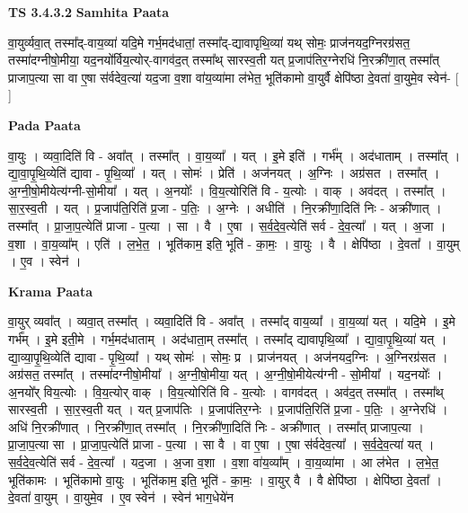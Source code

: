 \documentclass[17pt]{extarticle}
\begin{document}
\textbf{TS 3.4.3.2 } \newline
\textbf{Samhita Paata} \newline

वा॒युर्व्यवा॒त् तस्मा᳚द्-वाय॒व्या॑ यदि॒मे गर्भ॒मद॑धातां॒ तस्मा᳚द्-द्यावापृथि॒व्या॑ यथ् सोमः॒ प्राज॑नयद॒ग्निरग्र॑सत॒ तस्मा॑दग्नीषो॒मीया॒ यद॒नयो᳚र्विय॒त्योर्-वागव॑द॒त् तस्मा᳚थ् सारस्व॒ती यत् प्र॒जाप॑तिर॒ग्नेरधि॑ नि॒रक्री॑णा॒त् तस्मा᳚त् प्राजाप॒त्या सा वा ए॒षा स॑र्वदेव॒त्या॑ यद॒जा व॒शा वा॑य॒व्या॑मा ल॑भेत॒ भूति॑कामो वा॒युर्वै क्षेपि॑ष्ठा दे॒वता॑ वा॒युमे॒व स्वेन॑- [  ] \newline

\textbf{Pada Paata} \newline

वा॒युः । व्यवा॒दिति॑ वि - अवा᳚त् । तस्मा᳚त् । वा॒य॒व्या᳚ । यत् । इ॒मे इति॑ । गर्भ᳚म् । अद॑धाताम् । तस्मा᳚त् । द्या॒वा॒पृ॒थि॒व्येति॑ द्यावा - पृ॒थि॒व्या᳚ । यत् । सोमः॑ । प्रेति॑ । अज॑नयत् । अ॒ग्निः । अग्र॑सत । तस्मा᳚त् । अ॒ग्नी॒षो॒मीयेत्य॑ग्नी-सो॒मीया᳚ । यत् । अ॒नयोः᳚ । वि॒य॒त्योरिति॑ वि - य॒त्योः । वाक् । अव॑दत् । तस्मा᳚त् । सा॒र॒स्व॒ती । यत् । प्र॒जाप॑ति॒रिति॑ प्र॒जा - प॒तिः॒ । अ॒ग्नेः । अधीति॑ । नि॒रक्री॑णा॒दिति॑ निः - अक्री॑णात् । तस्मा᳚त् । प्रा॒जा॒प॒त्येति॑ प्राजा - प॒त्या । सा । वै । ए॒षा । स॒र्व॒दे॒व॒त्येति॑ सर्व - दे॒व॒त्या᳚ । यत् । अ॒जा । व॒शा । वा॒य॒व्या᳚म् । एति॑ । ल॒भे॒त॒ । भूति॑काम॒ इति॒ भूति॑ - का॒मः॒ । वा॒युः । वै । क्षेपि॑ष्ठा । दे॒वता᳚ । वा॒युम् । ए॒व । स्वेन॑ ।  \newline


\textbf{Krama Paata} \newline

वा॒युर् व्यवा᳚त् । व्यवा॒त् तस्मा᳚त् । व्यवा॒दिति॑ वि - अवा᳚त् । तस्मा᳚द् वाय॒व्या᳚ । वा॒य॒व्या॑ यत् । यदि॒मे । इ॒मे गर्भ᳚म् । इ॒मे इती॒मे । गर्भ॒मद॑धाताम् । अद॑धाता॒म् तस्मा᳚त् । तस्मा᳚द् द्यावापृथि॒व्या᳚ । द्या॒वा॒पृ॒थि॒व्या॑ यत् । द्या॒व्या॒पृ॒थि॒व्येति॑ द्यावा - पृ॒थि॒व्या᳚ । यथ् सोमः॑ । सोमः॒ प्र । प्राज॑नयत् । अज॑नयद॒ग्निः । अ॒ग्निरग्र॑सत । अग्र॑सत॒ तस्मा᳚त् । तस्मा॑दग्नीषो॒मीया᳚ । अ॒ग्नी॒षो॒मीया॒ यत् । अ॒ग्नी॒षो॒मीयेत्य॑ग्नी - सो॒मीया᳚ । यद॒नयोः᳚ । अ॒नयो᳚र् विय॒त्योः । वि॒य॒त्योर् वाक् । वि॒य॒त्योरिति॑ वि - य॒त्योः । वागव॑दत् । अव॑द॒त् तस्मा᳚त् । तस्मा᳚थ् सारस्व॒ती । सा॒र॒स्व॒ती यत् । यत् प्र॒जाप॑तिः । प्र॒जाप॑तिर॒ग्नेः । प्र॒जाप॑ति॒रिति॑ प्र॒जा - प॒तिः॒ । अ॒ग्नेरधि॑ । अधि॑ नि॒रक्री॑णात् । नि॒रक्री॑णा॒त् तस्मा᳚त् । नि॒रक्री॑णा॒दिति॑ निः - अक्री॑णात् । तस्मा᳚त् प्राजाप॒त्या । प्रा॒जा॒प॒त्या सा । प्रा॒जा॒प॒त्येति॑ प्राजा - प॒त्या । सा वै । वा ए॒षा । ए॒षा स॑र्वदेव॒त्या᳚ । स॒र्व॒दे॒व॒त्या॑ यत् । स॒र्व॒दे॒व॒त्येति॑ सर्व - दे॒व॒त्या᳚ । यद॒जा । अ॒जा व॒शा । व॒शा वा॑य॒व्या᳚म् । वा॒य॒व्या॑मा । आ ल॑भेत । ल॒भे॒त॒ भूति॑कामः । भूति॑कामो वा॒युः । भूति॑काम॒ इति॒ भूति॑ - का॒मः॒ । वा॒युर् वै । वै क्षेपि॑ष्ठा । क्षेपि॑ष्ठा दे॒वता᳚ । दे॒वता॑ वा॒युम् । वा॒युमे॒व । ए॒व स्वेन॑ । स्वेन॑ भाग॒धेये॑न \newline
\end{document}
